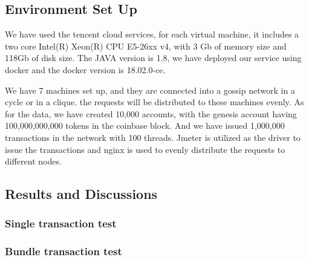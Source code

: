 \subsection {Environment Set Up}

We have used the tencent cloud services, for each virtual machine, it includes a two core Intel(R) Xeon(R) CPU E5-26xx v4, with 3 Gb of memory size and 118Gb of disk size. The JAVA version is 1.8, we have deployed our service using docker and the docker version is 18.02.0-ce.   

We have 7 machines set up, and they are connected into a gossip network in a cycle or in a clique. the requests will be distributed to these machines evenly.
As for the data, we have created 10,000 accounts, with the genesis account having 100,000,000,000 tokens in the coinbase block.
And we have issued 1,000,000 transactions in the network with 100 threads.
Jmeter is utilized as the driver to issue the transactions and nginx is used to evenly distribute the requests to different nodes.

\subsection {Results and Discussions}

\subsubsection {Single transaction test}

\subsubsection {Bundle transaction test}


